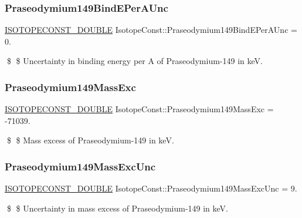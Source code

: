 \subsubsection{\texorpdfstring{Praseodymium149\+Bind\+E\+Per\+A\+Unc}{Praseodymium149BindEPerAUnc}}
{\footnotesize\ttfamily \mbox{\hyperlink{group___isotope_const-_macros_ga8f45a7272ce02c0b4c65c44636ed719a}{I\+S\+O\+T\+O\+P\+E\+C\+O\+N\+S\+T\+\_\+\+D\+O\+U\+B\+LE}} Isotope\+Const\+::\+Praseodymium149\+Bind\+E\+Per\+A\+Unc = 0.}

\$ \$ Uncertainty in binding energy per A of Praseodymium-\/149 in keV. \mbox{\label{group___isotope_const-_praseodymium-_pr149_gaccd62db1f21588bc428b72f3f4e8d9fe}} 
\subsubsection{\texorpdfstring{Praseodymium149\+Mass\+Exc}{Praseodymium149MassExc}}
{\footnotesize\ttfamily \mbox{\hyperlink{group___isotope_const-_macros_ga8f45a7272ce02c0b4c65c44636ed719a}{I\+S\+O\+T\+O\+P\+E\+C\+O\+N\+S\+T\+\_\+\+D\+O\+U\+B\+LE}} Isotope\+Const\+::\+Praseodymium149\+Mass\+Exc = -\/71039.}

\$ \$ Mass excess of Praseodymium-\/149 in keV. \mbox{\label{group___isotope_const-_praseodymium-_pr149_gaee0b8691151e79c04f585efc9150d9aa}} 
\subsubsection{\texorpdfstring{Praseodymium149\+Mass\+Exc\+Unc}{Praseodymium149MassExcUnc}}
{\footnotesize\ttfamily \mbox{\hyperlink{group___isotope_const-_macros_ga8f45a7272ce02c0b4c65c44636ed719a}{I\+S\+O\+T\+O\+P\+E\+C\+O\+N\+S\+T\+\_\+\+D\+O\+U\+B\+LE}} Isotope\+Const\+::\+Praseodymium149\+Mass\+Exc\+Unc = 9.}

\$ \$ Uncertainty in mass excess of Praseodymium-\/149 in keV. \mbox{\label{group___isotope_const-_praseodymium-_pr149_gae41419ab1009ed5709d46bdd756c02d8}} 
